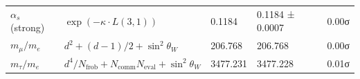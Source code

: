 \begin{longtable}[]{@{}lllll@{}}
\begin{minipage}[t]{0.13\columnwidth}\raggedright
\(\alpha_s\) (strong)\strut
\end{minipage} & \begin{minipage}[t]{0.25\columnwidth}\raggedright
\(\exp(-\kappa \cdot L(3,1))\)\strut
\end{minipage} & \begin{minipage}[t]{0.20\columnwidth}\raggedright
0.1184\strut
\end{minipage} & \begin{minipage}[t]{0.21\columnwidth}\raggedright
0.1184 ± 0.0007\strut
\end{minipage} & \begin{minipage}[t]{0.07\columnwidth}\raggedright
0.00σ\strut
\end{minipage}\tabularnewline
\begin{minipage}[t]{0.13\columnwidth}\raggedright
\(m_\mu/m_e\)\strut
\end{minipage} & \begin{minipage}[t]{0.25\columnwidth}\raggedright
\(d^2 + (d-1)/2 + \sin^2\theta_W\)\strut
\end{minipage} & \begin{minipage}[t]{0.20\columnwidth}\raggedright
206.768\strut
\end{minipage} & \begin{minipage}[t]{0.21\columnwidth}\raggedright
206.768\strut
\end{minipage} & \begin{minipage}[t]{0.07\columnwidth}\raggedright
0.00σ\strut
\end{minipage}\tabularnewline
\begin{minipage}[t]{0.13\columnwidth}\raggedright
\(m_\tau/m_e\)\strut
\end{minipage} & \begin{minipage}[t]{0.25\columnwidth}\raggedright
\(d^4/N_{\text{frob}} + N_{\text{comm}}N_{\text{eval}} + \sin^2\theta_W\)\strut
\end{minipage} & \begin{minipage}[t]{0.20\columnwidth}\raggedright
3477.231\strut
\end{minipage} & \begin{minipage}[t]{0.21\columnwidth}\raggedright
3477.228\strut
\end{minipage} & \begin{minipage}[t]{0.07\columnwidth}\raggedright
0.01σ\strut
\end{minipage}\tabularnewline

\end{longtable}
